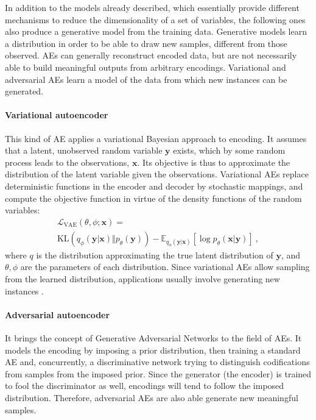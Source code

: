 In addition to the models already described, which essentially provide different mechanisms to reduce the dimensionality of a set of variables, the following ones also produce a generative model from the training data. Generative models learn a distribution in order to be able to draw new samples, different from those observed. AEs can generally reconstruct encoded data, but are not necessarily able to build meaningful outputs from arbitrary encodings. Variational and adversarial AEs learn a model of the data from which new instances can be generated.

\paragraph{Variational autoencoder } This kind of AE applies a variational Bayesian  approach to encoding. It assumes that a latent, unobserved random variable $\mathbf{y}$ exists, which by some random process leads to the observations, $\mathbf{x}$. Its objective is thus to approximate the distribution of the latent variable given the observations. Variational AEs replace deterministic functions in the encoder and decoder by stochastic mappings, and compute the objective function in virtue of the density functions of the random variables:
\begin{multline}
  \mathcal L_{\mathrm{VAE}}(\theta, \phi; \mathbf{x})=\\\mathrm{KL}(
  q_{\phi}(\mathbf{y}\vert\mathbf{x})
  \Vert
  p_{\theta}(\mathbf{y})
  )
  -
  \mathbb E_{  q_{\phi}(\mathbf{y}\vert\mathbf{x})}\left[\log p_{\theta}(\mathbf{x}\vert\mathbf{y})\right]~,
\end{multline}
where $q$ is the distribution approximating the true latent distribution of $\mathbf{y}$, and $\theta,\phi$ are the parameters of each distribution. Since variational AEs allow sampling from the learned distribution, applications usually involve generating new instances .

\paragraph{Adversarial autoencoder } It brings the concept of Generative Adversarial Networks  to the field of AEs. It models the encoding by imposing a prior distribution, then training a standard AE and, concurrently, a discriminative network trying to distinguish codifications from samples from the imposed prior. Since the generator (the encoder) is trained to fool the discriminator as well, encodings will tend to follow the imposed distribution. Therefore, adversarial AEs are also able generate new meaningful samples. \\

